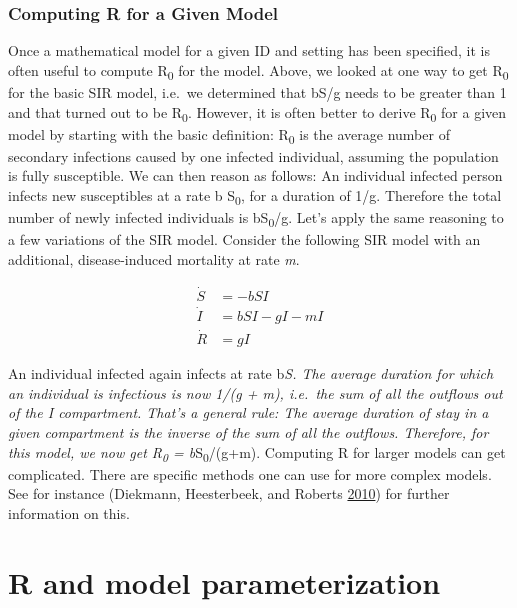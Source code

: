 \documentclass[]{book}
\theoremstyle{definition}
\theoremstyle{definition}
\theoremstyle{definition}
\theoremstyle{remark}
\begin{document}
\hypertarget{myadvancedbox}{%
\subsubsection{Computing R for a Given Model}\label{myadvancedbox}}

Once a mathematical model for a given ID and setting has been specified,
it is often useful to compute R\textsubscript{0} for the model. Above,
we looked at one way to get R\textsubscript{0} for the basic SIR model,
i.e.~we determined that bS/g needs to be greater than 1 and that turned
out to be R\textsubscript{0}. However, it is often better to derive
R\textsubscript{0} for a given model by starting with the basic
definition: R\textsubscript{0} is the average number of secondary
infections caused by one infected individual, assuming the population is
fully susceptible. We can then reason as follows: An individual infected
person infects new susceptibles at a rate b S\textsubscript{0}, for a
duration of 1/g. Therefore the total number of newly infected
individuals is bS\textsubscript{0}/g. Let's apply the same reasoning to
a few variations of the SIR model. Consider the following SIR model with
an additional, disease-induced mortality at rate \emph{m}.

\[ 
\begin{aligned}
\dot S &= -b SI \\
\dot I &= b S I - g I - m I\\
\dot R &= g I
\end{aligned}
\]

An individual infected again infects at rate b\emph{S. The average
duration for which an individual is infectious is now 1/(g + m),
i.e.~the sum of all the outflows out of the \emph{I} compartment. That's
a general rule: The average duration of stay in a given compartment is
the inverse of the sum of all the outflows. Therefore, for this model,
we now get R\textsubscript{0} = b}S\textsubscript{0}/(g+m). Computing R
for larger models can get complicated. There are specific methods one
can use for more complex models. See for instance (Diekmann,
Heesterbeek, and Roberts \protect\hyperlink{ref-diekmann10}{2010}) for
further information on this.

\hypertarget{r-and-model-parameterization}{%
\section{R and model
parameterization}\label{r-and-model-parameterization}}
\end{document}
